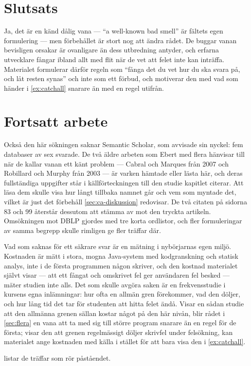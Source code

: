 \section{Slutsats}
\label{sec:ca-slutsats}

Ja, det är en känd dålig vana --- \enquote{a well-known bad smell} är
fältets egen formulering --- men förbehållet är stort nog att ändra
rådet.  De buggar vanan bevisligen orsakar är ovanligare än dess
utbredning antyder, och erfarna utvecklare fångar ibland allt med flit
när de vet att felet inte kan inträffa.  Materialet formulerar därför
regeln som \enquote{fånga det du vet hur du ska svara på, och låt resten
synas} och inte som ett förbud, och motiverar den med vad som händer i
\cref{ex:catchall} snarare än med en regel utifrån.

\section{Fortsatt arbete}
\label{sec:ca-fortsatt}

Också den här sökningen saknar Semantic Scholar, som avvisade sin
nyckel: fem databaser av sex svarade.  De två äldre arbeten som Ebert
med flera hänvisar till när de kallar vanan ett känt problem ---
Cabral och Marques från 2007 och Robillard och Murphy från 2003 --- är
varken hämtade eller lästa här, och deras fullständiga uppgifter står i
källförteckningen till den studie kapitlet citerar.  Att läsa dem
skulle visa hur långt tillbaka namnet går och vem som myntade det,
vilket är just det förbehåll \cref{sec:ca-diskussion} redovisar.  De
två citaten på sidorna 83 och 99 återstår dessutom att stämma av mot
den tryckta artikeln.  Omsökningen mot DBLP gjordes med tre korta
ordlistor, och fler formuleringar av samma begrepp skulle rimligen ge
fler träffar där.

Vad som saknas för ett säkrare svar är en mätning i nybörjarnas egen
miljö.  Kostnaden är mätt i stora, mogna Java-system med kodgranskning
och statisk analys, inte i de första programmen någon skriver, och den
kostnad materialet självt visar --- att ett fångat och omskrivet fel
ger användaren fel besked --- mäter studien inte alls.  Det som skulle
avgöra saken är en frekvensstudie i kursens egna inlämningar: hur ofta
en allmän gren förekommer, vad den döljer, och hur lång tid det tar för
studenten att hitta felet ändå.  Visar en sådan studie att den allmänna
grenen sällan kostar något på den här nivån, blir rådet i
\cref{sec:flera} en vana att ta med sig till större program snarare än
en regel för de första; visar den att grenen regelmässigt döljer
skrivfel under felsökning, kan materialet ange kostnaden med källa i
stället för att bara visa den i \cref{ex:catchall}.

\bigskip
\noindent
{} listar de träffar som rör påståendet.



